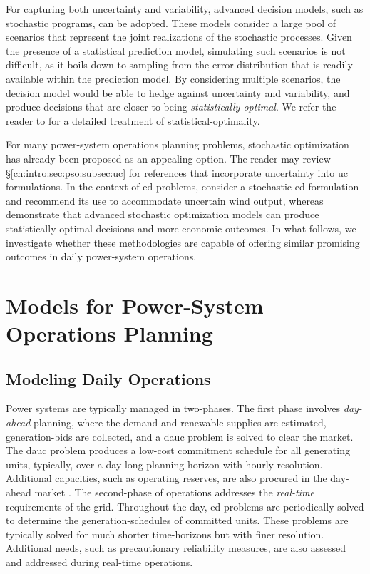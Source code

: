 For capturing both uncertainty and variability, advanced decision models, such as stochastic programs, can be adopted. These models consider a large pool of scenarios that represent the joint realizations of the stochastic processes. Given the presence of a statistical prediction model, simulating such scenarios is not difficult, as it boils down to sampling from the error distribution that is readily available within the prediction model. By considering multiple scenarios, the decision model would be able to hedge against uncertainty and variability, and produce decisions that are closer to being \textit{statistically optimal}. We refer the reader to \cite{Sen} for a detailed treatment of statistical-optimality.

For many power-system operations planning problems, stochastic optimization has already been proposed as an appealing option. The reader may review \S\ref{ch:intro:sec:pso:subsec:uc} for references that incorporate uncertainty into  \gls{uc} formulations. In the context of \gls{ed} problems, \cite{Lee2013} consider a stochastic \gls{ed} formulation and recommend its use to accommodate uncertain wind output, whereas \cite{Gangammanavar2016} demonstrate that advanced stochastic optimization models can produce statistically-optimal decisions and more economic outcomes. In what follows, we investigate whether these methodologies are capable of offering similar promising outcomes in daily power-system operations. 

\section{Models for Power-System Operations Planning}
\label{ch:td:sec:models}

\subsection{Modeling Daily Operations} 
\label{ch:td:sec:models:subsec:experimentalframework}

Power systems are typically managed in two-phases. The first phase involves \emph{day-ahead} planning, where the demand and renewable-supplies are estimated, generation-bids are collected, and a \gls{dauc} problem is solved to clear the market. The \gls{dauc} problem produces a low-cost commitment schedule for all generating units, typically, over a day-long planning-horizon with hourly resolution. Additional capacities, such as operating reserves, are also procured in the day-ahead market \citep{Doherty2005, Morales2009}. The second-phase of operations addresses the \emph{real-time} requirements of the grid. Throughout the day, \gls{ed} problems are periodically solved to determine the generation-schedules of committed units. These problems are typically solved for much shorter time-horizons but with finer resolution. Additional needs, such as precautionary reliability measures, are also assessed and addressed during real-time operations. 

